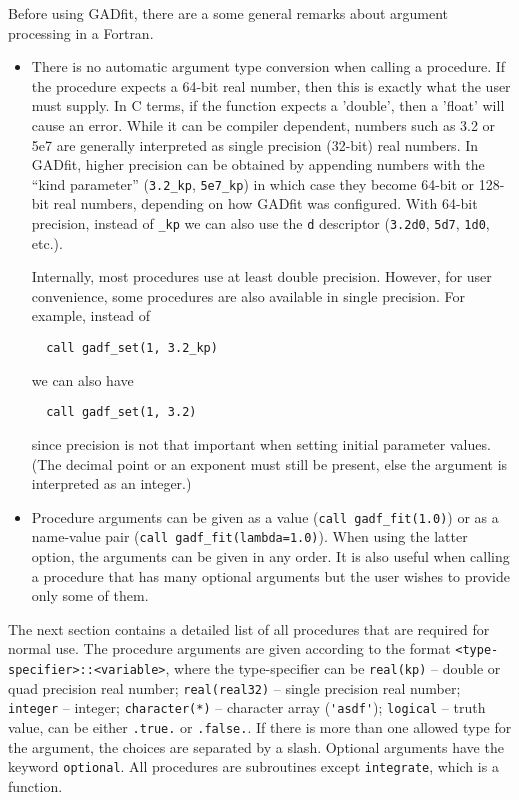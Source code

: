 \documentclass{article}
\begin{document}
Before using GADfit, there are a some general remarks about argument processing in a Fortran.
\begin{itemize}
\item There is no automatic argument type conversion when calling a procedure. If the procedure expects a 64-bit real number, then this is exactly what the user must supply. In C terms, if the function expects a 'double', then a 'float' will cause an error. While it can be compiler dependent, numbers such as 3.2 or 5e7 are generally interpreted as single precision (32-bit) real numbers. In GADfit, higher precision can be obtained by appending numbers with the ``kind parameter'' (\verb+3.2_kp+, \verb+5e7_kp+) in which case they become 64-bit or 128-bit real numbers, depending on how GADfit was configured. With 64-bit precision, instead of \verb+_kp+ we can also use the \texttt{d} descriptor (\texttt{3.2d0}, \texttt{5d7}, \texttt{1d0}, etc.).

Internally, most procedures use at least double precision. However, for user convenience, some procedures are also available in single precision. For example, instead of
\begin{verbatim}
  call gadf_set(1, 3.2_kp)
\end{verbatim}
  we can also have
\begin{verbatim}
  call gadf_set(1, 3.2)
\end{verbatim}
  since precision is not that important when setting initial parameter values. (The decimal point or an exponent must still be present, else the argument is interpreted as an integer.)

\item Procedure arguments can be given as a value (\verb+call gadf_fit(1.0)+) or as a name-value pair (\verb+call gadf_fit(lambda=1.0)+). When using the latter option, the arguments can be given in any order. It is also useful when calling a procedure that has many optional arguments but the user wishes to provide only some of them.
\end{itemize}
The next section contains a detailed list of all procedures that are required for normal use. The procedure arguments are given according to the format \verb+<type-specifier>::<variable>+, where the type-specifier can be \verb+real(kp)+ -- double or quad precision real number; \verb+real(real32)+ -- single precision real number; \verb+integer+ -- integer; \verb+character(*)+ -- character array (\verb+'asdf'+); \verb+logical+ -- truth value, can be either \verb+.true.+ or \verb+.false.+. If there is more than one allowed type for the argument, the choices are separated by a slash. Optional arguments have the keyword \verb+optional+. All procedures are subroutines except \verb+integrate+, which is a function.
\end{document}
